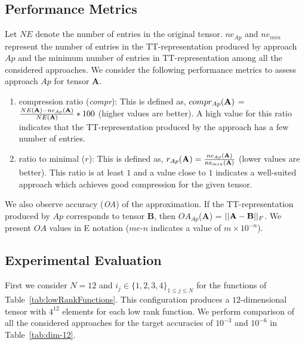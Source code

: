 \documentclass[runningheads]{llncs}
\newcommand{\tensor}[1]{{\cal\textbf{#1}\xspace}}
\begin{document}
\subsection{Performance Metrics}

Let $NE$ denote the number of entries in the original tensor. $ne_{Ap}$ and $ne_{min}$ represent the number of entries in the TT-representation produced by approach $Ap$ and the minimum number of entries in TT-representation among all the considered approaches. We consider the following performance metrics to assess approach $Ap$ for tensor \tensor{A}.
\begin{enumerate}
	\item compression ratio (\textit{compr}): This is defined as, $compr_{Ap}(\tensor{A})$ = $\frac{NE(\tensor{A})- ne_{Ap}(\tensor{A})}{NE(\tensor{A})}*100$ (higher values are better). A high value for this ratio indicates that the TT-representation produced by the approach has a few number of entries.
	\item ratio to minimal ($r$): This is defined as, $r_{Ap}(\tensor{A}) = \frac{ne_{Ap}(\tensor{A})}{ne_{min}(\tensor{A})}$ (lower values are better). This ratio is at least $1$ and a value close to $1$ indicates a well-suited approach which achieves good compression for the given tensor. 
\end{enumerate}

\noindent We also observe accuracy (\textit{OA}) of the approximation. If the TT-representation produced by $Ap$ corresponds to tensor \tensor{B}, then $OA_{Ap}$(\tensor{A}) = $||\tensor{A}-\tensor{B}||_F$. We present $OA$ values in E notation ($me$-$n$ indicates a value of $m\times10^{-n}$).


\subsection{Experimental Evaluation}
First we consider $N=12$ and $i_j \in \{1, 2, 3, 4\}_{1\le j \le N}$ for the functions of Table~\ref{tab:lowRankFunctions}. This configuration produces a $12$-dimensional tensor with $4^{12}$ elements for each low rank function. We perform comparison of all the considered approaches for the target accuracies of $10^{-3}$ and $10^{-6}$ in Table~\ref{tab:dim-12}. 
\end{document}
